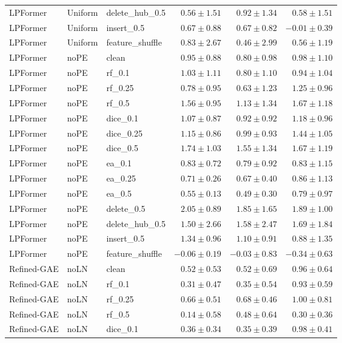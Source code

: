 \documentclass[UTF8,a4paper,11pt,fontset=fandol]{ctexart}
\begin{document}
{\begin{longtable}{lllrrr}
LPFormer & Uniform & delete\_hub\_0.5 & $0.56\pm1.51$ & $0.92\pm1.34$ & $0.58\pm1.51$ \\
LPFormer & Uniform & insert\_0.5 & $0.67\pm0.88$ & $0.67\pm0.82$ & $-0.01\pm0.39$ \\
LPFormer & Uniform & feature\_shuffle & $0.83\pm2.67$ & $0.46\pm2.99$ & $0.56\pm1.19$ \\
LPFormer & noPE & clean & $0.95\pm0.88$ & $0.80\pm0.98$ & $0.98\pm1.10$ \\
LPFormer & noPE & rf\_0.1 & $1.03\pm1.11$ & $0.80\pm1.10$ & $0.94\pm1.04$ \\
LPFormer & noPE & rf\_0.25 & $0.78\pm0.95$ & $0.63\pm1.23$ & $1.25\pm0.96$ \\
LPFormer & noPE & rf\_0.5 & $1.56\pm0.95$ & $1.13\pm1.34$ & $1.67\pm1.18$ \\
LPFormer & noPE & dice\_0.1 & $1.07\pm0.87$ & $0.92\pm0.92$ & $1.18\pm0.96$ \\
LPFormer & noPE & dice\_0.25 & $1.15\pm0.86$ & $0.99\pm0.93$ & $1.44\pm1.05$ \\
LPFormer & noPE & dice\_0.5 & $1.74\pm1.03$ & $1.55\pm1.34$ & $1.67\pm1.19$ \\
LPFormer & noPE & ea\_0.1 & $0.83\pm0.72$ & $0.79\pm0.92$ & $0.83\pm1.15$ \\
LPFormer & noPE & ea\_0.25 & $0.71\pm0.26$ & $0.67\pm0.40$ & $0.86\pm1.13$ \\
LPFormer & noPE & ea\_0.5 & $0.55\pm0.13$ & $0.49\pm0.30$ & $0.79\pm0.97$ \\
LPFormer & noPE & delete\_0.5 & $2.05\pm0.89$ & $1.85\pm1.65$ & $1.89\pm1.00$ \\
LPFormer & noPE & delete\_hub\_0.5 & $1.50\pm2.66$ & $1.58\pm2.47$ & $1.69\pm1.84$ \\
LPFormer & noPE & insert\_0.5 & $1.34\pm0.96$ & $1.10\pm0.91$ & $0.88\pm1.35$ \\
LPFormer & noPE & feature\_shuffle & $-0.06\pm0.19$ & $-0.03\pm0.83$ & $-0.34\pm0.63$ \\
Refined-GAE & noLN & clean & $0.52\pm0.53$ & $0.52\pm0.69$ & $0.96\pm0.64$ \\
Refined-GAE & noLN & rf\_0.1 & $0.31\pm0.47$ & $0.35\pm0.54$ & $0.93\pm0.59$ \\
Refined-GAE & noLN & rf\_0.25 & $0.66\pm0.51$ & $0.68\pm0.46$ & $1.00\pm0.81$ \\
Refined-GAE & noLN & rf\_0.5 & $0.14\pm0.58$ & $0.48\pm0.64$ & $0.30\pm0.36$ \\
Refined-GAE & noLN & dice\_0.1 & $0.36\pm0.34$ & $0.35\pm0.39$ & $0.98\pm0.41$ \\

\end{longtable}}
\end{document}
